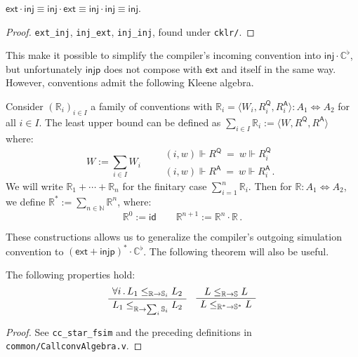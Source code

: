 \documentclass[sigplan,10pt,review,anonymous]{acmart}\settopmatter{printfolios=true,printccs=false,printacmref=false}
\newcommand{\kw}[1]{\ensuremath{ \mathsf{#1} }}
\begin{document}
\begin{theorem} \label{thm:extinj}
$
  \kw{ext} \cdot \kw{inj} \equiv
  \kw{inj} \cdot \kw{ext} \equiv
  \kw{inj} \cdot \kw{inj} \equiv
  \kw{inj}
$.
\begin{proof}
\texttt{ext\_inj}, \texttt{inj\_ext}, \texttt{inj\_inj},
found under \texttt{cklr/}.
\end{proof}
\end{theorem}

This make it possible to simplify
the compiler's incoming convention
into $\kw{inj} \cdot \mathbb{C}^\flat$,
but unfortunately \kw{injp}
does not compose with \kw{ext} and itself in the same way.
However, conventions
admit the following Kleene algebra.

\begin{definition} %
Consider $(\mathbb{R}_i)_{i \in I}$
a family of conventions
with
$\mathbb{R}_i = \langle W_i, R_i^\kw{Q}, R_i^\kw{A} \rangle
  : A_1 \Leftrightarrow A_2$
for all $i \in I$.
The least upper bound
can be defined as
$\sum_{i \in I} \mathbb{R}_i := \langle W, R^\kw{Q}, R^\kw{A} \rangle$
where:
\[
  W := \sum_{i \in I} W_i  \qquad
  \begin{array}{l}
  (i, w) \Vdash R^\kw{Q} \: = \: w \Vdash R_i^\kw{Q} \\[1ex]
  (i, w) \Vdash R^\kw{A} \: = \: w \Vdash R_i^\kw{A} \,.
  \end{array}
\]
We will write $\mathbb{R}_1 + \cdots + \mathbb{R}_n$
for the finitary case $\sum_{i=1}^n \mathbb{R}_i$.
Then for $\mathbb{R} : A_1 \Leftrightarrow A_2$,
we define
$\mathbb{R}^* := \sum_{n \in \mathbb{N}} \mathbb{R}^n$,
where:
\[
  \mathbb{R}^0 := \kw{id} \qquad
  \mathbb{R}^{n+1} := \mathbb{R}^n \cdot \mathbb{R} \,.
\]
\end{definition}

These constructions allows us to generalize the compiler's
outgoing simulation convention to
$(\kw{ext} + \kw{injp})^* \cdot \mathbb{C}^\flat$.
The following theorem will also be useful.

\begin{theorem} \label{thm:simk} %
The following properties hold:
\[
  \AxiomC{$\forall i \,.\,
    L_1 \le_{\mathbb{R} \rightarrow \mathbb{S}_i} L_2$}
  \UnaryInfC{$
    L_1 \le_{\mathbb{R} \rightarrow \sum_i \mathbb{S}_i} L_2$}
  \DisplayProof
  \quad
  \AxiomC{$L \le_{\mathbb{R} \rightarrow \mathbb{S}} L$}
  \UnaryInfC{$L \le_{\mathbb{R}^* \rightarrow \mathbb{S}^*} L$}
  \DisplayProof
\]
\begin{proof}
See \texttt{cc\_star\_fsim} and the preceding definitions
in \texttt{common/CallconvAlgebra.v}.
\end{proof}
\end{theorem}
\end{document}
